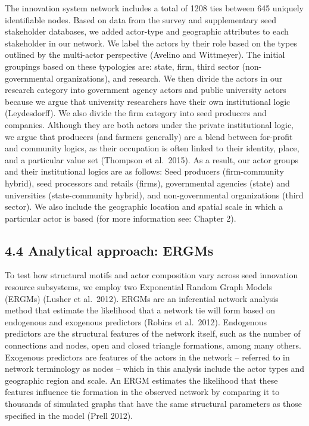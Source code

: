 \documentclass[twoside,12pt,final]{ucthesis-CA2012}
\begin{document}
\begin{ucmainmatter}
The innovation system network includes a total of 1208 ties between 645
uniquely identifiable nodes. Based on data from the survey and
supplementary seed stakeholder databases, we added actor-type and
geographic attributes to each stakeholder in our network. We label the
actors by their role based on the types outlined by the multi-actor
perspective (Avelino and Wittmeyer). The initial groupings based on
these typologies are: state, firm, third sector (non-governmental
organizations), and research. We then divide the actors in our research
category into government agency actors and public university actors
because we argue that university researchers have their own
institutional logic (Leydesdorff). We also divide the \textquotesingle firm\textquotesingle{} category
into seed producers and companies. Although they are both actors under
the private institutional logic, we argue that producers (and farmers
generally) are a blend between for-profit and community logics, as their
occupation is often linked to their identity, place, and a particular
value set (Thompson et al.~2015). As a result, our actor groups and
their institutional logics are as follows: Seed producers
(firm-community hybrid), seed processors and retails (firms),
governmental agencies (state) and universities (state-community hybrid),
and non-governmental organizations (third sector). We also include the
geographic location and spatial scale in which a particular actor is
based (for more information see: Chapter 2).

\hypertarget{analytical-approach-ergms}{%
\subsection{4.4 Analytical approach: ERGMs}\label{analytical-approach-ergms}}

To test how structural motifs and actor composition vary across seed
innovation resource subsystems, we employ two Exponential Random Graph
Models (ERGMs) (Lusher et al.~2012). ERGMs are an inferential network
analysis method that estimate the likelihood that a network tie will
form based on endogenous and exogenous predictors (Robins et al.~2012).
Endogenous predictors are the structural features of the network itself,
such as the number of connections and nodes, open and closed triangle
formations, among many others. Exogenous predictors are features of the
actors in the network -- referred to in network terminology as \textquotesingle nodes\textquotesingle{}
-- which in this analysis include the actor types and geographic region
and scale. An ERGM estimates the likelihood that these features
influence tie formation in the observed network by comparing it to
thousands of simulated graphs that have the same structural parameters
as those specified in the model (Prell 2012).


\end{ucmainmatter}
\end{document}
